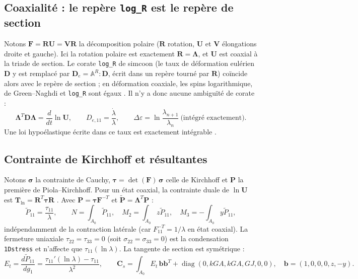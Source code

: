 \documentclass[11pt,a4paper]{article}
\newcommand{\Lam}{\bm{\Lambda}}
\newcommand{\code}[1]{\texttt{#1}}
\begin{document}
\subsection{Coaxialité : le repère \code{log\_R} est le repère de section}
Notons $\mathbf F=\mathbf R\mathbf U=\mathbf V\mathbf R$ la décomposition
polaire ($\mathbf R$ rotation, $\mathbf U$ et $\mathbf V$ élongations droite et
gauche). Ici la rotation polaire est exactement $\mathbf R=\Lam$, et $\mathbf U$
est coaxial à la triade de section. Le corate \code{log\_R} de
simcoon (le taux de déformation eulérien $\mathbf D$ y est remplacé par
$\mathbf D_e=\mathbb A^R:\mathbf D$, écrit dans un repère tourné par $\mathbf R$) coïncide
alors avec le repère de section ; en déformation coaxiale, les spins
logarithmique, de Green--Naghdi et \code{log\_R} sont égaux
\cite{xiao1997}. Il n'y a donc aucune ambiguïté de corate :
\begin{equation}
\Lam^T\mathbf D\Lam=\frac{d}{dt}\ln\mathbf U,\qquad D_{e,11}=\frac{\dot\lambda}{\lambda},\qquad
\Delta\varepsilon=\ln\frac{\lambda_{n+1}}{\lambda_n}\ \text{(intégré exactement)}.
\end{equation}
Une loi hypoélastique écrite dans ce taux est exactement intégrable
\cite{xiao1997,xiao1999}.

\subsection{Contrainte de Kirchhoff et résultantes}
Notons $\bm\sigma$ la contrainte de Cauchy, $\bm\tau=\det(\mathbf F)\,\bm\sigma$
celle de Kirchhoff et $\mathbf P$ la première de Piola--Kirchhoff. Pour un état
coaxial, la contrainte duale de $\ln\mathbf U$ est
$\mathbf T_{\ln}=\mathbf R^T\bm\tau\mathbf R$ \cite{hoger1987}. Avec
$\mathbf P=\bm\tau\mathbf F^{-T}$ et $\tilde{\mathbf P}=\Lam^T\mathbf P$ :
\begin{equation}
\tilde P_{11}=\frac{\tau_{11}}{\lambda},\qquad
N=\int_{A_0}\tilde P_{11},\quad M_2=\int_{A_0}z\tilde P_{11},\quad M_3=-\int_{A_0}y\tilde P_{11},
\end{equation}
indépendamment de la contraction latérale (car $F^{-T}_{11}=1/\lambda$ en état
coaxial). La fermeture uniaxiale $\tau_{22}=\tau_{33}=0$ (soit
$\sigma_{22}=\sigma_{33}=0$) est la condensation \code{1Dstress} et n'affecte
que $\tau_{11}(\ln\lambda)$. La tangente de section est symétrique :
\begin{equation}
E_t=\frac{d\tilde P_{11}}{dg_1}=\frac{\tau_{11}'(\ln\lambda)-\tau_{11}}{\lambda^2},\qquad
\mathbf C_s=\int_{A_0}E_t\,\mathbf b\mathbf b^T+\operatorname{diag}(0,kGA,kGA,GJ,0,0),\quad
\mathbf b=(1,0,0,0,z,-y).
\end{equation}
\end{document}
